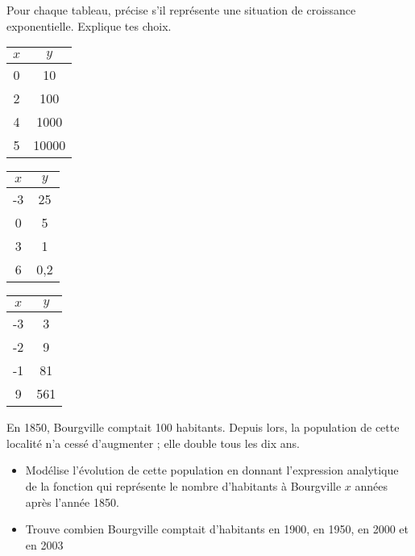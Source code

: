 \documentclass[a4paper,12pt,singlepage]{report}
\begin{document}
\begin{exercice}
Pour chaque tableau, précise s’il représente une situation de croissance
exponentielle. Explique tes choix.

\par \setlength{\columnseprule}{0 pt}
          \begin{minipage}[t]{\linewidth}
          \begin{multicols}{3}

\begin{center}
\begin{tabular}{|c|c|}
\hline
\(x\) & \(y\)\\[0pt]
\hline
0 & 10\\[0pt]
\hline
2 & 100\\[0pt]
\hline
4 & 1000\\[0pt]
\hline
5 & 10000\\[0pt]
\hline
\end{tabular}
\end{center}

\begin{center}
\begin{tabular}{|c|c|}
\hline
\(x\) & \(y\)\\[0pt]
\hline
-3 & 25\\[0pt]
\hline
0 & 5\\[0pt]
\hline
3 & 1\\[0pt]
\hline
6 & 0,2\\[0pt]
\hline
\end{tabular}
\end{center}

\begin{center}
\begin{tabular}{|c|c|}
\hline
\(x\) & \(y\)\\[0pt]
\hline
-3 & 3\\[0pt]
\hline
-2 & 9\\[0pt]
\hline
-1 & 81\\[0pt]
\hline
9 & 561\\[0pt]
\hline
\end{tabular}
\end{center}


\end{multicols}\end{minipage}
\end{exercice}

\begin{exercice}
En 1850, Bourgville comptait 100 habitants. Depuis lors, la population de cette
localité n'a cessé d'augmenter ; elle double tous les dix ans.
\begin{itemize}
\item Modélise l'évolution de cette population en donnant l’expression analytique
de la fonction qui représente le nombre d’habitants à Bourgville \(x\) années
après l’année 1850.
\item Trouve combien Bourgville comptait d'habitants en 1900, en 1950, en 2000
et en 2003
\end{itemize}
\end{exercice}
\end{document}
